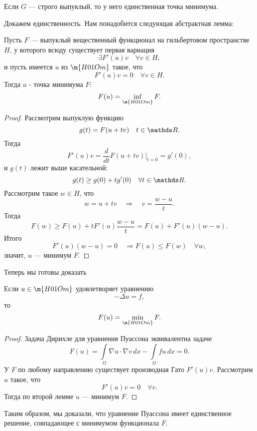 \begin{exercise}
Если $G$ --- строго выпуклый, то у него единственная точка минимума.
\end{exercise}

Докажем единственность. Нам понадобится следующая абстрактная лемма:

\begin{lemma} Пусть $F$ --- выпуклый вещественный функционал на гильбертовом пространстве $H$, у которого всюду существует первая вариация
$$ \exists F'(u) v \quad \forall v \in H,$$ и пусть имеется $u$ из $\m{H01Om}$ такое, что
$$ F'(u)v = 0 \quad \forall v \in H.$$
Тогда $u$ - точка минимума $F$:
$$ F(u) = \inf_{\m{H01Om}} F. $$
\end{lemma}
\begin{proof}
Рассмотрим выпуклую функцию
$$ g(t) = F(u+tv) \quad t\in \real.$$
Тогда
$$F'(u)v = \frac{d}{dt} F(u+tv)\Big\rvert_{t=0} = g'(0),$$
и $g(t)$ лежит выше касательной:
$$g(t) \geq g(0) + tg'(0) \quad \forall t \in \real.$$
Рассмотрим такое $w \in H$, что
$$ w = u + tv \quad \Rightarrow \quad v = \frac {w-u} {t}.$$
Тогда
$$ F(w) \geq F(u) + t F'(u) \frac{w-u}{t} = F(u) + F'(u)(w-u).$$
Итого
$$ F'(u)(w-u) = 0 \quad \Rightarrow F(u) \leq F(w) \quad \forall w,$$
значит, $u$ --- минимум $F$.

\end{proof}
Теперь мы готовы доказать
\begin{theorem}
Если $u \in \m{H01Om}$ удовлетворяет уравнению
$$ - \Delta u = f,$$
то $$F(u) = \min_{\m{H01Om}} F.$$ 
\end{theorem}
\begin{proof}
Задача Дирихле для уравнения Пуассона эквивалентна задаче
$$F(u) = \int \limits_\Omega \nabla u \cdot \nabla v \, dx - \int \limits_\Omega fu \, dx = 0.$$
У $F$ по любому направлению существует производная Гато $F'(u)v$. Рассмотрим $u$ такое, что 
$$ F'(u) v = 0 \quad \forall v.$$
Тогда по второй лемме $u$ --- минимум $F$.

\end{proof}

Таким образом, мы доказали, что уравнение Пуассона имеет единственное решение, совпадающее с минимумом функционала $F$.


